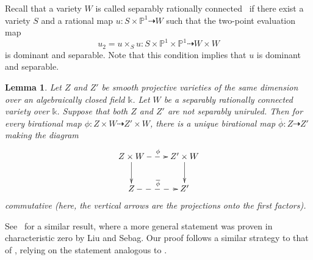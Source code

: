 \documentclass[a4paper,12pt]{amsart}
\def\k{\mathbb k}
\def\P{\mathbb P}
\def\ol{\overline}
\theoremstyle{plain}
\newtheorem{lem}[dummy]{Lemma}
\numberwithin{equation}{section}
\theoremstyle{definition}
\renewcommand{\(}{\left(}
\renewcommand{\)}{\right)}
\newcommand{\dto}{\dashrightarrow}
\begin{document}
Recall that a variety $W$ is called separably rationally connected~\cite[IV.3.2.3]{Kollarrat}
if there exist a variety $S$ and a rational map
$u : S \times \P^1 \dto W$ such that the two-point evaluation map
\begin{equation}\label{eq:rat-conn}
    u_2 = u \times_S u : S \times \P^1 \times \P^1  \dto W \times W
\end{equation}
is dominant and separable.
Note that this condition implies that $u$ is dominant 
and separable.

\begin{lem}\label{lem-stbirCY} 
Let $Z$ and $Z'$ be smooth projective varieties 
of the same dimension
over 
an algebraically closed field $\k$.
Let $W$ be a separably rationally connected variety over $\k$.
Suppose that both $Z$ and $Z'$ are not separably uniruled.
Then for
every birational map
$\phi : Z \times W \dto Z' \times W$,
there is a unique birational map
$\ol{\phi} : Z \dto Z'$ making the diagram
\begin{equation}\label{eq-ZZW}
    \xymatrix{
Z \times W \ar[d] \ar@{-->}[r]^{\phi} & Z' \times W \ar[d] \\
Z  \ar@{-->}[r]^{\ol{\phi}} & Z'  \\
}
\end{equation}
commutative \textup(here, the vertical arrows are the
projections onto the first factors\textup).
\end{lem}

See~\cite[Theorem 2]{LiuSebag} for a similar result,
where 
a more general statement 
was proven in characteristic zero by Liu and Sebag.
Our proof follows a similar strategy
to that of \cite[Theorem 2]{LiuSebag},
relying on the statement analogous
to \cite[Lemma 5]{LiuSebag}.
\end{document}
